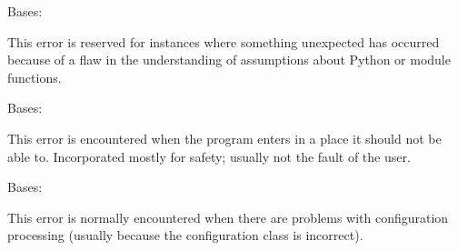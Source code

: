 \documentclass[letterpaper,10pt,english]{sphinxmanual}
\begin{document}
\begin{fulllineitems}
\label{\detokenize{python_docstrings/IfA_Smeargle.meta.errors:IfA_Smeargle.meta.errors.AssumptionError}}
Bases: {\hyperref[\detokenize{python_docstrings/IfA_Smeargle.meta.errors:IfA_Smeargle.meta.errors.Smeargle_BaseException}]{}}

This error is reserved for instances where something unexpected has
occurred because of a flaw in the understanding of assumptions about
Python or module functions.

\end{fulllineitems}


\begin{fulllineitems}
\label{\detokenize{python_docstrings/IfA_Smeargle.meta.errors:IfA_Smeargle.meta.errors.BrokenLogicError}}
Bases: {\hyperref[\detokenize{python_docstrings/IfA_Smeargle.meta.errors:IfA_Smeargle.meta.errors.Smeargle_BaseException}]{}}

This error is encountered when the program enters in a place it should
not be able to. Incorporated mostly for safety; usually not the fault of
the user.

\end{fulllineitems}


\begin{fulllineitems}
\label{\detokenize{python_docstrings/IfA_Smeargle.meta.errors:IfA_Smeargle.meta.errors.ConfigurationError}}
Bases: {\hyperref[\detokenize{python_docstrings/IfA_Smeargle.meta.errors:IfA_Smeargle.meta.errors.Smeargle_Exception}]{}}

This error is normally encountered when there are problems with
configuration processing (usually because the configuration class is
incorrect).

\end{fulllineitems}
\end{document}
